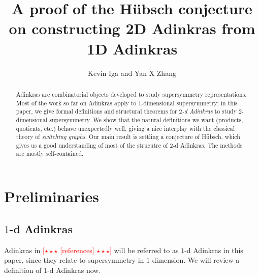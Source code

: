 \documentclass[12pt,twoside,singlespace]{article}
\title{A proof of the H\"ubsch conjecture on constructing 2D Adinkras from 1D Adinkras}
\author{Kevin Iga and Yan X Zhang}
\numberwithin{equation}{section}
\theoremstyle{definition}
\newcommand{\com}[1]{\textcolor{red}{$[\star \star \star$ #1 $\star \star \star]$}}
\begin{document}
\pagestyle{plain}

\maketitle

\begin{abstract}
Adinkras are combinatorial objects developed to study supersymmetry representations. Most of the work so far on Adinkras apply to $1$-dimensional supersymmetry; in this paper, we give formal definitions and structural theorems for \emph{$2$-d Adinkras} to study $2$-dimensional supersymmetry. We show that the natural definitions we want (products, quotients, etc.) behave unexpectedly well, giving a nice interplay with the classical theory of \emph{switching graphs}. Our main result is settling a conjecture of H\"ubsch, which gives us a good understanding of most of the strucutre of $2$-d Adinkras. The methods are mostly self-contained.
\end{abstract}

\section{Preliminaries}

\subsection{$1$-d Adinkras}
Adinkras in \com{[references]} will be referred to as $1$-d Adinkras in this paper, since they relate to supersymmetry in $1$ dimension.  We will review a definition of $1$-d Adinkras now.
\end{document}
